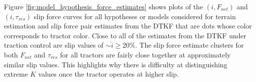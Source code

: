 Figure \ref{fig:model_hypothesis_force_estimates} shows plots of the $(i,F_{net})$ and $(i,\tau_{res})$ slip force curves for all hypotheses or models considered for terrain estimation and slip force pair estimates from the DTKF that are dots whose color corresponds to tractor color. Close to all of the estimates from the DTKF under traction control are slip values of $\sim\hat{i} \geq 20 \%$. The slip force estimate clusters for both $F_{net}$ and $\tau_{res}$ for all tractors are fairly close together at approximately similar slip values. This highlights why there is difficulty at distinguishing extreme $K$ values once the tractor operates at higher slip.


